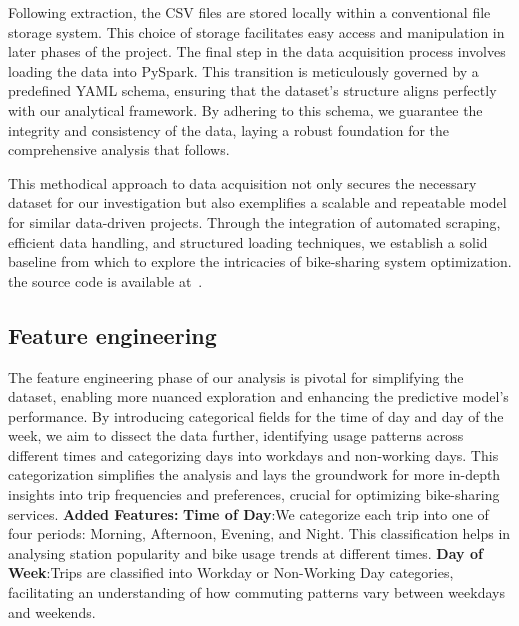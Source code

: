 \documentclass[12pt, a4paper]{article}
\begin{document}
    Following extraction, the CSV files are stored locally within a conventional file storage system.
    This choice of storage facilitates easy access and manipulation in later phases of the project.
    The final step in the data acquisition process involves loading the data into PySpark.
    This transition is meticulously governed by a predefined YAML schema, ensuring that the dataset's structure aligns perfectly with our analytical framework.
    By adhering to this schema, we guarantee the integrity and consistency of the data, laying a robust foundation for the comprehensive analysis that follows.

    This methodical approach to data acquisition not only secures the necessary dataset for our investigation but also exemplifies a scalable and repeatable model for similar data-driven projects.
    Through the integration of automated scraping, efficient data handling, and structured loading techniques, we establish a solid baseline from which to explore the intricacies of bike-sharing system optimization.
    the source code is available at~\cite{TechProjectSourceCode}.

    \subsection{Feature engineering}\label{subsec:feature-engineering}
    The feature engineering phase of our analysis is pivotal for simplifying the dataset, enabling more nuanced exploration and enhancing the predictive model's performance.
    By introducing categorical fields for the time of day and day of the week, we aim to dissect the data further, identifying usage patterns across different times and categorizing days into workdays and non-working days.
    This categorization simplifies the analysis and lays the groundwork for more in-depth insights into trip frequencies and preferences, crucial for optimizing bike-sharing services.\newline
    \textbf{Added Features:}\newline
    \textbf{Time of Day}:\newline We categorize each trip into one of four periods: Morning, Afternoon, Evening, and Night. This classification helps in analysing station popularity and bike usage trends at different times.\newline
    \textbf{Day of Week}:\newline Trips are classified into Workday or Non-Working Day categories, facilitating an understanding of how commuting patterns vary between weekdays and weekends.\newline
\end{document}
